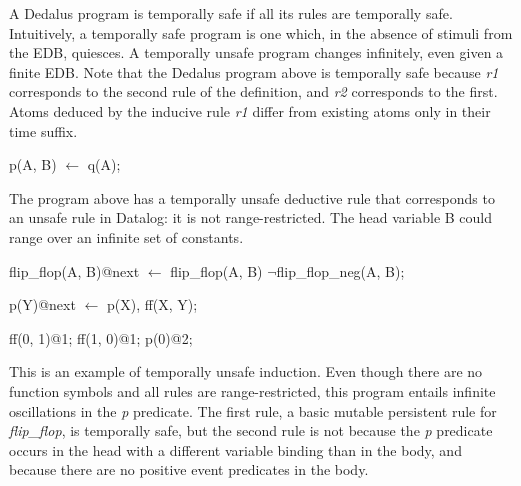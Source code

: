 A Dedalus program is temporally safe if all its rules are temporally safe. Intuitively, a temporally safe 
program is one which, in the absence of stimuli from the EDB, quiesces.  A temporally unsafe program
changes infinitely, even given a finite EDB.  Note that the Dedalus program above is temporally safe
because \emph{r1} corresponds to the second rule of the definition, and \emph{r2} corresponds to the
first.  Atoms deduced by the inducive rule \emph{r1} differ from existing atoms only in their time suffix.

\begin{example}

\begin{Dedalus}
p(A, B) \(\leftarrow\)
  q(A);
\end{Dedalus}

The program above has a temporally unsafe deductive rule that corresponds to an unsafe rule in Datalog: it is not range-restricted.  
The head variable B could range over an infinite set of constants.
\end{example}


\begin{example}


\begin{Dedalus}
flip_flop(A, B)@next  \(\leftarrow\)
    flip_flop(A, B)
    \(\lnot\)flip_flop_neg(A, B);

p(Y)@next  \(\leftarrow\)
    p(X),
    ff(X, Y);


ff(0, 1)@1;
ff(1, 0)@1;
p(0)@2;

\end{Dedalus}


This is an example of temporally unsafe induction.  Even though there are no function symbols and all rules are range-restricted,
this program entails infinite oscillations in the \emph{p} predicate.  The first rule, a basic mutable persistent rule for \emph{flip\_flop}, is
temporally safe, but the second rule is not because the \emph{p} predicate occurs in the head with a different variable binding than in 
the body, and because there are no positive event predicates in the body. 

\end{example}



